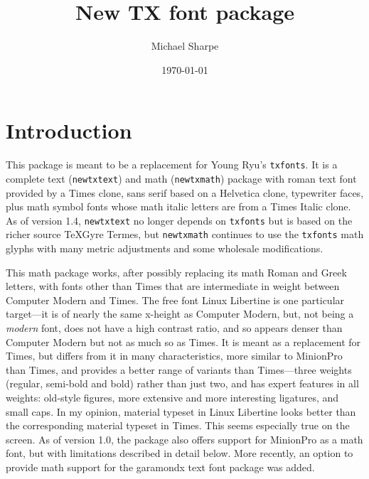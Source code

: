 \documentclass[11pt]{article}
\title{New TX font package}
\author{Michael Sharpe}
\date{\today}  %
\theoremstyle{oldplain}
\theoremstyle{plain}
\begin{document}
\maketitle
\section{Introduction}
This package is meant to be a replacement for Young Ryu's {\tt txfonts}. It is  a complete text ({\tt newtxtext}) and math ({\tt newtxmath}) package with roman text font provided by  a Times clone, sans serif based on a \textsf{Helvetica} clone, typewriter faces, plus math symbol fonts whose math italic letters are from a Times Italic clone. As of version 1.4, {\tt newtxtext} no longer depends on {\tt txfonts} but is based on the richer source \textsf{TeXGyre Termes}, but {\tt newtxmath} continues to use the {\tt txfonts} math glyphs with many metric adjustments and some wholesale modifications.

This math package works, after possibly replacing its math Roman and Greek letters, with fonts other than Times that are intermediate in weight between Computer Modern and Times. The free font Linux Libertine is one particular target---it is of nearly the same x-height as Computer Modern, but, not being a \emph{modern} font, does not have a high contrast ratio, and so appears  denser than Computer Modern but not as much so as Times. It is meant as a replacement for Times, but  differs from it in many characteristics, more similar to MinionPro than Times, and provides a better range of variants than Times---three weights (regular, semi-bold and bold) rather than just two, and has expert features in all weights: old-style figures, more extensive and more interesting ligatures,  and  small caps. In my opinion, material typeset in Linux Libertine looks better than the corresponding material typeset in Times. This seems especially true on the screen. As of version 1.0, the package also offers support for MinionPro as a math font, but with limitations described in detail below. More recently, an option to provide math support for the \textsf{garamondx} text font package was added.
\end{document}
